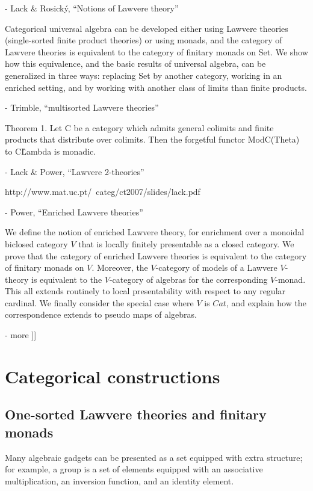 \documentclass{article}
\begin{document}
- Lack \& Rosick\'y, ``Notions of Lawvere theory''

  Categorical universal algebra can be developed either using Lawvere theories (single-sorted finite product theories) or using monads, and the category of Lawvere theories is equivalent to the category of finitary monads on Set. We show how this equivalence, and the basic results of universal algebra, can be generalized in three ways: replacing Set by another category, working in an enriched setting, and by working with another class of limits than finite products.
  
- Trimble, ``multisorted Lawvere theories''

  Theorem 1. Let C be a category which admits general colimits and finite products that distribute over colimits. Then the forgetful functor ModC(Theta) to C\^Lambda is monadic.

- Lack \& Power, ``Lawvere 2-theories''

  http://www.mat.uc.pt/~categ/ct2007/slides/lack.pdf

- Power, ``Enriched Lawvere theories''

  We define the notion of enriched Lawvere theory, for enrichment over a monoidal biclosed category $V$ that is locally finitely presentable as a closed category. We prove that the category of enriched Lawvere theories is equivalent to the category of finitary monads on $V$. Moreover, the $V$-category of models of a Lawvere $V$-theory is equivalent to the $V$-category of algebras for the corresponding $V$-monad. This all extends routinely to local presentability with respect to any regular cardinal. We finally consider the special case where $V$ is $Cat$, and explain how the correspondence extends to pseudo maps of algebras.

- more
]]

\section{Categorical constructions}

\subsection{One-sorted Lawvere theories and finitary monads}

Many algebraic gadgets can be presented as a set equipped with extra structure; for example, a group is a set of elements equipped with an associative multiplication, an inversion function, and an identity element.
\end{document}
